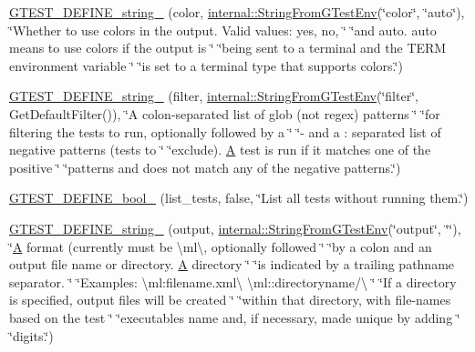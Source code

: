\begin{DoxyCompactItemize}
\item 
\hyperlink{namespacetesting_a32f0280e95e7718835b0e3d2f7277269}{G\+T\+E\+S\+T\+\_\+\+D\+E\+F\+I\+N\+E\+\_\+string\+\_\+} (color, \hyperlink{namespacetesting_1_1internal_ac54dabc540bf79c2de91add679bfb93b}{internal\+::\+String\+From\+G\+Test\+Env}(\char`\"{}color\char`\"{}, \char`\"{}auto\char`\"{}), \char`\"{}Whether to use colors in the output.  Valid values\+: yes, no, \char`\"{} \char`\"{}and auto.  \textquotesingle{}auto\textquotesingle{} means to use colors if the output is \char`\"{} \char`\"{}being sent to a terminal and the T\+E\+RM environment variable \char`\"{} \char`\"{}is set to a terminal type that supports colors.\char`\"{})
\item 
\hyperlink{namespacetesting_a2830ee1f2237233fa44aa580c5a919ce}{G\+T\+E\+S\+T\+\_\+\+D\+E\+F\+I\+N\+E\+\_\+string\+\_\+} (filter, \hyperlink{namespacetesting_1_1internal_ac54dabc540bf79c2de91add679bfb93b}{internal\+::\+String\+From\+G\+Test\+Env}(\char`\"{}filter\char`\"{}, Get\+Default\+Filter()), \char`\"{}A colon-\/separated list of glob (not regex) patterns \char`\"{} \char`\"{}for filtering the tests to run, optionally followed by a \char`\"{} \char`\"{}\textquotesingle{}-\/\textquotesingle{} and a \+: separated list of negative patterns (tests to \char`\"{} \char`\"{}exclude).  \hyperlink{namespacetesting_a5e9134d655d2fc9323902348083282e7}{A} test is run if it matches one of the positive \char`\"{} \char`\"{}patterns and does not match any of the negative patterns.\char`\"{})
\item 
\hyperlink{namespacetesting_a0fa31ecbf33c5e5970cca1d91c050153}{G\+T\+E\+S\+T\+\_\+\+D\+E\+F\+I\+N\+E\+\_\+bool\+\_\+} (list\+\_\+tests, false, \char`\"{}List all tests without running them.\char`\"{})
\item 
\hyperlink{namespacetesting_a6f67b9169db6b5872f61d462b113cb85}{G\+T\+E\+S\+T\+\_\+\+D\+E\+F\+I\+N\+E\+\_\+string\+\_\+} (output, \hyperlink{namespacetesting_1_1internal_ac54dabc540bf79c2de91add679bfb93b}{internal\+::\+String\+From\+G\+Test\+Env}(\char`\"{}output\char`\"{}, \char`\"{}\char`\"{}), \char`\"{}\hyperlink{namespacetesting_a5e9134d655d2fc9323902348083282e7}{A} format (currently must be \textbackslash{}ml\textbackslash{}, optionally followed \char`\"{} \char`\"{}by a colon and an output file name or directory. \hyperlink{namespacetesting_a5e9134d655d2fc9323902348083282e7}{A} directory \char`\"{} \char`\"{}is indicated by a trailing pathname separator. \char`\"{} \char`\"{}Examples\+: \textbackslash{}ml\+:filename.\+xml\textbackslash{} \textbackslash{}ml\+::directoryname/\textbackslash{} \char`\"{} \char`\"{}If a directory is specified, output files will be created \char`\"{} \char`\"{}within that directory, with file-\/names based on the test \char`\"{} \char`\"{}executable\textquotesingle{}s name and, if necessary, made unique by adding \char`\"{} \char`\"{}digits.\char`\"{})

\end{DoxyCompactItemize}
